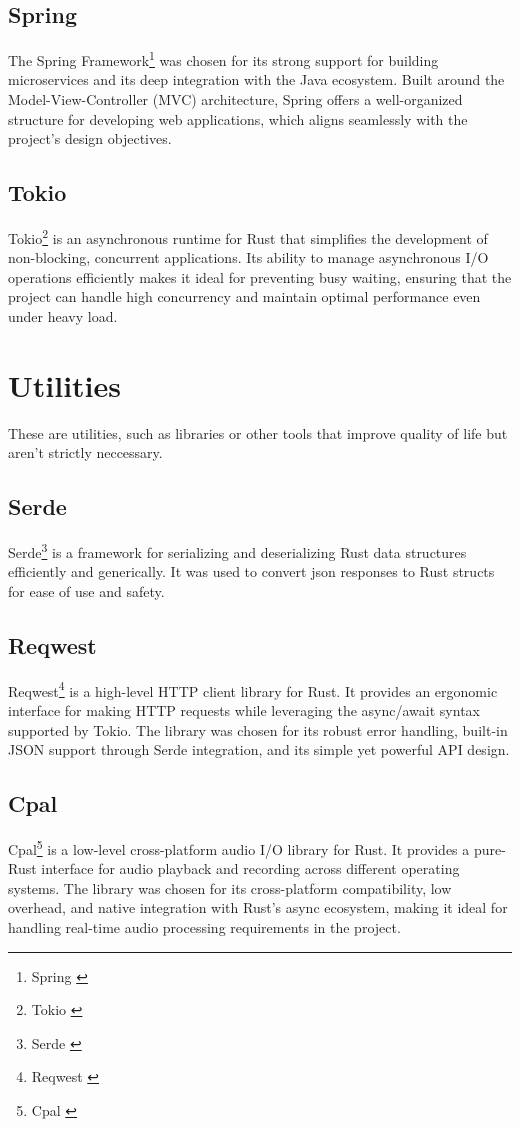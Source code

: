 \subsection{Spring}
The Spring Framework\footnote{Spring \cite{spring}} was chosen for its
strong support for building microservices
and its deep integration with the Java ecosystem.
Built around the Model-View-Controller (MVC) architecture,
Spring offers a well-organized structure
for developing web applications, which aligns seamlessly with
the project’s design objectives.

\subsection{Tokio}
Tokio\footnote{Tokio \cite{tokio}} is an asynchronous runtime for Rust
that simplifies the development of non-blocking, concurrent applications.
Its ability to manage asynchronous I/O operations efficiently makes it
ideal for preventing busy waiting,
ensuring that the project can handle high concurrency and maintain
optimal performance even under heavy load.

\section{Utilities}
These are utilities, such as libraries or other tools that improve quality of life but aren't strictly neccessary.

\subsection{Serde}
Serde\footnote{Serde \cite{serde}} is a framework for serializing and deserializing Rust data structures efficiently and generically.
It was used to convert json responses to Rust structs for ease of use and safety.

\subsection{Reqwest}
Reqwest\footnote{Reqwest \cite{reqwest}} is a high-level HTTP client library for Rust.
It provides an ergonomic interface for making HTTP requests while leveraging the async/await syntax supported by Tokio.
The library was chosen for its robust error handling, built-in JSON support through Serde integration, and its simple yet powerful API design.

\subsection{Cpal}
Cpal\footnote{Cpal \cite{cpal}} is a low-level cross-platform audio I/O library for Rust.
It provides a pure-Rust interface for audio playback and recording across different operating systems.
The library was chosen for its cross-platform compatibility, low overhead, and native integration with Rust's async ecosystem,
making it ideal for handling real-time audio processing requirements in the project.

